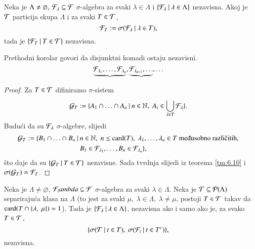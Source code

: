 \begin{kor} \label{kor:6.11}
    Neka je $\Lambda \neq \varnothing, \: \mathcal{F}_\lambda \subseteq \mathcal{F}$ $\sigma$-algebra za svaki $\lambda \in \Lambda$ i $\{{\mathcal{F}_\lambda} \: | \: {\lambda \in \Lambda}\}$ nezavisna.
    Akoj je $\mathcal{T}$ particija skupa $\Lambda$ i za svaki $T \in \mathcal{T}$,
    \begin{equation*}
        \mathcal{F}_T := \sigma({\mathcal{F}_\lambda} \: | \: {\lambda \in T}),
    \end{equation*}
    tada je $\{{\mathcal{F}_T} \: | \: {T \in \mathcal{T}}\}$ nezavisna.
\end{kor}

\begin{nap}
    Prethodni korolar govori da disjunktni komadi ostaju nezavisni.
    \begin{equation*}
        \underbrace{\mathcal{F}_{\lambda_1}, \ldots, \mathcal{F}_{\lambda_n}} , \underbrace{\mathcal{F}_{\lambda_{n + 1}}, \ldots}, \ldots
    \end{equation*}
\end{nap}

\begin{proof}
    Za $T \in \mathcal{T}$ difiniramo $\pi$-sistem
    \begin{equation*}
        \mathcal{G}_T := \{{A_1 \cap \ldots \cap A_n} \: | \: {n \in \mathbb{N}, \; A_i \in \bigcup\limits_{\lambda \in T}^{}\mathcal{F}_\lambda}\}.
    \end{equation*}
    Budu\' ci da su $\mathcal{F}_\lambda$ $\sigma$-algebre, slijedi
    \begin{align*}
        \famG_T := \{B_1 \cap \ldots \cap B_n \: | \: &n \in \nat, \; n \leq \card{T}, \; \lambda_1, \ldots, \lambda_n \in T \textnormal{ me\dj usobno razli\v citih},\\ &B_1 \in \famF_{\lambda_1},\ldots, B_n \in \famF_{\lambda_n}\},
    \end{align*}
    \v sto daje da su $\{{\mathcal{G}_T} \: | \: {T \in \mathcal{T}}\}$ nezavisne.
    Sada tvrdnja slijedi iz teorema \ref{tm:6.10} i $\sigma({\mathcal{G}_T}) = \mathcal{F}_T$.
\end{proof}

\begin{prop}    \label{prop:6.12}
    Neka je $\Lambda \neq \varnothing$, $\mathcal{F}_lambda \subseteq \mathcal{F}$ $\sigma$-algebra za svaki $\lambda \in \Lambda$.
    Neka je $\mathcal{T} \subseteq \mathcal{P}({\Lambda})$ separiraju\' ca klasa na $\Lambda$ (to jest za svaki $\mu, \; \lambda \in \Lambda, \; \lambda \neq \mu$, postoji $T \in \mathcal{T}$ takav da $\textnormal{card}({T \cap \{\lambda, \; \mu\}}) = 1$).
    Tada je $\{{\mathcal{F}_\lambda} \: | \: {\lambda \in \Lambda}\}$, nezavisna ako i samo ako je, za svako $T \in \mathcal{T}$,
    \begin{equation*}
        \{ \sigma({\mathcal{T}} \: | \: {t \in T}), \; \sigma({\mathcal{F}_t} \: | \: {t \in T^c}) \},
    \end{equation*}
    nezavisna.
\end{prop}

